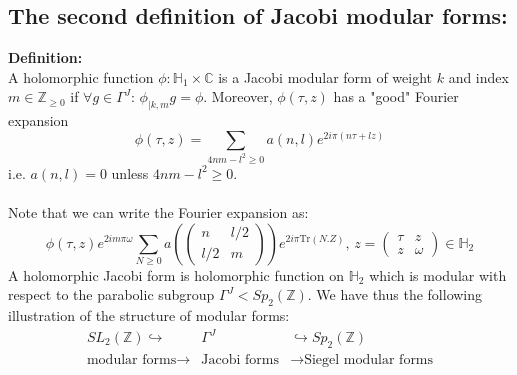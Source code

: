 \documentclass[10pt,a4paper]{article}
\begin{document}
\subsection{The second definition of Jacobi modular forms:}
\textbf{Definition:}\\
A holomorphic function $\phi:\mathbb{H}_1\times\mathbb{C}$ is a Jacobi modular form of weight $k$ and index $m\in\mathbb{Z}_{\geq0}$ if $\forall g\in\Gamma^J$: $\phi_{|k,m}g=\phi$. Moreover, $\phi(\tau,z)$ has a "good" Fourier expansion 
\[\phi(\tau,z)=\sum_{4nm-l^2\geq0}a(n,l)e^{2i\pi(n\tau+lz)}\]
i.e. $a(n,l)=0$ unless $4nm-l^2\geq0$.\\
\\
Note that we can write the Fourier expansion as:
\[\phi(\tau,z)e^{2im\pi\omega}\sum_{N\geq0}a\left(\left(\begin{array}{cc}n&l/2\\l/2&m\end{array}\right)\right)e^{2i\pi\textrm{Tr}(N.Z)},\,z=\left(\begin{array}{cc}\tau&z\\z&\omega\end{array}\right)\in\mathbb{H}_2
\]
A holomorphic Jacobi form is holomorphic function on $\mathbb{H}_2$ which is modular with respect to the parabolic subgroup $\Gamma^J<Sp_2(\mathbb{Z})$. We have thus the following illustration of the structure of modular forms:
\begin{eqnarray*}
SL_2(\mathbb{Z})\hookrightarrow&\Gamma^J&\hookrightarrow Sp_2
(\mathbb{Z})\\
\textrm{modular forms}\rightarrow&\textrm{Jacobi forms}&\rightarrow\textrm{Siegel modular forms}
\end{eqnarray*}
\end{document}
